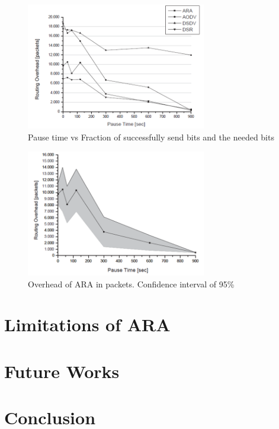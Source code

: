 \begin{figure}[t!]
\centering
\includegraphics[width=0.7\textwidth]{Picture5.png}
\caption{\label{fig:picture5}Pause time vs Fraction of successfully send bits and the needed bits}
\end{figure}

\begin{figure}[t!]
\centering
\includegraphics[width=0.7\textwidth]{Picture6.png}
\caption{\label{fig:picture6}Overhead of ARA in packets. Confidence interval of 95\%}
\end{figure}



\section{Limitations of ARA}

\section{Future Works}

\section{Conclusion}

